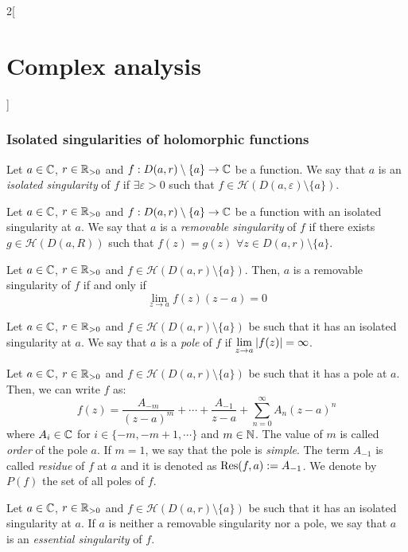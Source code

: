 \documentclass[../../../main.tex]{subfiles}
\begin{document}
\begin{multicols}{2}[\section{Complex analysis}]
  \subsubsection{Isolated singularities of holomorphic functions}
  \begin{definition}
    Let $a\in\mathbb{C}$, $r\in\mathbb{R}_{>0}$ and $f:D(a,r)\setminus\{a\}\rightarrow\mathbb{C}$ be a function. We say that $a$ is an \emph{isolated singularity} of $f$ if $\exists \varepsilon>0$ such that $f\in\mathcal{H}(D(a,\varepsilon)\setminus\{a\})$.
  \end{definition}
  \begin{definition}
    Let $a\in\mathbb{C}$, $r\in\mathbb{R}_{>0}$ and $f:D(a,r)\setminus\{a\}\rightarrow\mathbb{C}$ be a function with an isolated singularity at $a$. We say that $a$ is a \emph{removable singularity} of $f$ if there exists $g\in \mathcal{H}(D(a,R))$ such that $f(z)=g(z)$ $\forall z\in D(a,r)\setminus\{a\}$.
  \end{definition}
  \begin{theorem}
    Let $a\in\mathbb{C}$, $r\in\mathbb{R}_{>0}$ and $f\in\mathcal{H}(D(a,r)\setminus\{a\})$. Then, $a$ is a removable singularity of $f$ if and only if $$\lim_{z\to a}f(z)(z-a)=0$$
  \end{theorem}
  \begin{definition}
    Let $a\in\mathbb{C}$, $r\in\mathbb{R}_{>0}$ and $f\in\mathcal{H}(D(a,r)\setminus\{a\})$ be such that it has an isolated singularity at $a$. We say that $a$ is a \emph{pole} of $f$ if $\displaystyle\lim_{z\to a}\abs{f(z)}=\infty$.
  \end{definition}
  \begin{proposition}[Pole]
    Let $a\in\mathbb{C}$, $r\in\mathbb{R}_{>0}$ and $f\in\mathcal{H}(D(a,r)\setminus\{a\})$ be such that it has a pole at $a$. Then, we can write $f$ as: $$f(z)=\frac{A_{-m}}{{(z-a)}^m}+\cdots+\frac{A_{-1}}{z-a}+\sum_{n=0}^\infty A_n{(z-a)}^n$$ where $A_i\in\mathbb{C}$ for $i\in\{-m,-m+1,\cdots\}$ and $m\in\mathbb{N}$. The value of $m$ is called \emph{order} of the pole $a$. If $m=1$, we say that the pole is \emph{simple}. The term $A_{-1}$ is called \emph{residue} of $f$ at $a$ and it is denoted as $\Res(f,a):=A_{-1}$. We denote by $P(f)$ the set of all poles of $f$.
  \end{proposition}
  \begin{definition}
    Let $a\in\mathbb{C}$, $r\in\mathbb{R}_{>0}$ and $f\in\mathcal{H}(D(a,r)\setminus\{a\})$ be such that it has an isolated singularity at $a$. If $a$ is neither a removable singularity nor a pole, we say that $a$ is an \emph{essential singularity} of $f$.

\end{definition}
\end{multicols}
\end{document}
